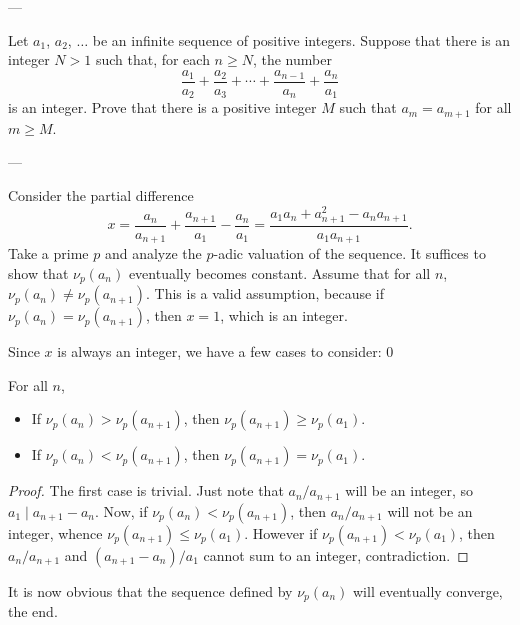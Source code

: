 
---

Let $a_1$, $a_2$, $\ldots$ be an infinite sequence of positive integers. Suppose that there is an integer $N>1$ such that, for each $n\ge N$, the number \[\frac{a_1}{a_2}+\frac{a_2}{a_3}+\cdots+\frac{a_{n-1}}{a_n}+\frac{a_n}{a_1}\]
is an integer. Prove that there is a positive integer $M$ such that $a_m=a_{m+1}$ for all $m\ge M$.

---

Consider the partial difference \[x=\frac{a_n}{a_{n+1}}+\frac{a_{n+1}}{a_1}-\frac{a_n}{a_1}=\frac{a_1a_n+a_{n+1}^2-a_na_{n+1}}{a_1a_{n+1}}.\]
Take a prime $p$ and analyze the $p$-adic valuation of the sequence. It suffices to show that $\nu_p(a_n)$ eventually becomes constant. Assume that for all $n$, $\nu_p(a_n)\ne\nu_p(a_{n+1})$. This is a valid assumption, because if $\nu_p(a_n)=\nu_p(a_{n+1})$, then $x=1$, which is an integer.

Since $x$ is always an integer, we have a few cases to consider:
\setcounter{iclaim}0
\begin{iclaim}
    For all $n$,
    \begin{itemize}
        \item If $\nu_p(a_n)>\nu_p(a_{n+1})$, then $\nu_p(a_{n+1})\ge\nu_p(a_1)$.
        \item If $\nu_p(a_n)<\nu_p(a_{n+1})$, then $\nu_p(a_{n+1})=\nu_p(a_1)$.
    \end{itemize}
\end{iclaim}
\begin{proof}
    The first case is trivial. Just note that $a_n/a_{n+1}$ will be an integer, so $a_1\mid a_{n+1}-a_n$. Now, if $\nu_p(a_n)<\nu_p(a_{n+1})$, then $a_n/a_{n+1}$ will not be an integer, whence $\nu_p(a_{n+1})\le\nu_p(a_1)$. However if $\nu_p(a_{n+1})<\nu_p(a_1)$, then $a_n/a_{n+1}$ and $(a_{n+1}-a_n)/a_1$ cannot sum to an integer, contradiction.
\end{proof}

It is now obvious that the sequence defined by $\nu_p(a_n)$ will eventually converge, the end.

